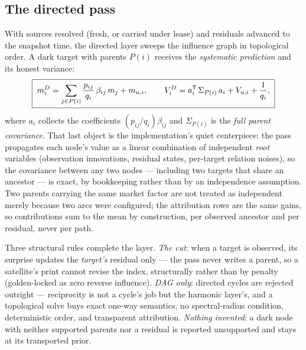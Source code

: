 \documentclass[11pt]{article}
\begin{document}
\subsection{The directed pass}
\label{sec:directedpass}

With sources resolved (fresh, or carried under lease) and residuals
advanced to the snapshot time, the directed layer sweeps the influence
graph in topological order.  A dark target with parents $P(i)$ receives
the \emph{systematic prediction} and its honest variance:
\begin{equation}
\boxed{\;
m^D_i=\sum_{j\in P(i)}\frac{p_{ij}}{q_i}\,\beta_{ij}\,m_j+m_{u,i},
\qquad
V^D_i=a_i^{\mathsf{T}}\,\Sigma_{P(i)}\,a_i+V_{u,i}+\frac{1}{q_i},
\;}
\label{eq:directedpred}
\end{equation}
where $a_i$ collects the coefficients $(p_{ij}/q_i)\beta_{ij}$ and
$\Sigma_{P(i)}$ is the \emph{full parent covariance}.  That last object
is the implementation's quiet centerpiece: the pass propagates each
node's value as a linear combination of independent \emph{root} variables
(observation innovations, residual states, per-target relation noises),
so the covariance between any two nodes --- including two targets that
share an ancestor --- is exact, by bookkeeping rather than by an
independence assumption.  Two parents carrying the same market factor are
not treated as independent merely because two arcs were configured; the
attribution rows are the same gains, so contributions sum to the mean by
construction, per observed ancestor and per residual, never per path.

Three structural rules complete the layer.  \emph{The cut}: when a target
is observed, its surprise updates the \emph{target's} residual only ---
the pass never writes a parent, so a satellite's print cannot revise the
index, structurally rather than by penalty (golden-locked as zero reverse
influence).  \emph{DAG only}: directed cycles are rejected outright ---
reciprocity is not a cycle's job but the harmonic layer's, and a
topological solve buys exact one-way semantics, no spectral-radius
condition, deterministic order, and transparent attribution.
\emph{Nothing invented}: a dark node with neither supported parents nor a
residual is reported unsupported and stays at its transported prior.
\end{document}
